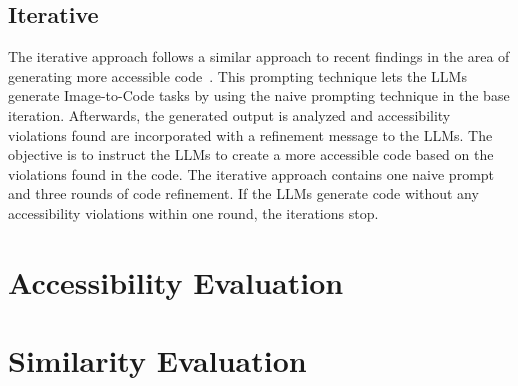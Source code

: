 \subsection{Iterative}
The iterative approach follows a similar approach to recent findings in the area
of generating more accessible code~\parencite{suh2025accessiblecode}. This 
prompting technique lets the LLMs generate Image-to-Code tasks by using the naive 
prompting technique in the base iteration. Afterwards, the generated output is 
analyzed and accessibility violations found are incorporated with a refinement 
message to the LLMs. The objective is to instruct the LLMs to create a more 
accessible code based on the violations found in the code. The iterative approach 
contains one naive prompt and three rounds of code refinement. If the LLMs 
generate code without any accessibility violations within one round, the 
iterations stop.


\section{Accessibility Evaluation}

\section{Similarity Evaluation}
